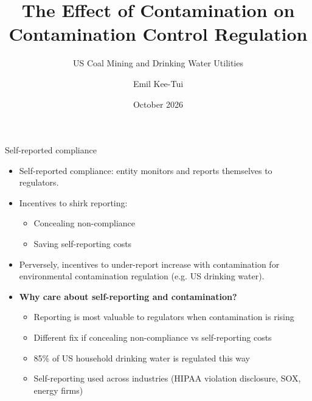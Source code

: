\documentclass{beamer}
\title[Contamination and Self-Reported Compliance]{The Effect of Contamination on Contamination Control Regulation}
\subtitle{US Coal Mining and Drinking Water Utilities}
\author{Emil Kee-Tui}
\institute{Charles H. Dyson School of Applied Economics and Management \\ Cornell University}
\date{October 2026}
\begin{document}
\begin{frame}
\titlepage
\end{frame}

\begin{frame}{Self-reported compliance}
\begin{itemize}
    \item Self-reported compliance: entity monitors and reports themselves to regulators.
    \item Incentives to shirk reporting:
    \begin{itemize}
        \item Concealing non-compliance
        \item Saving self-reporting costs
    \end{itemize}
    \item Perversely, incentives to under-report increase with contamination for environmental contamination regulation (e.g. US drinking water).
    \item \textbf{Why care about self-reporting and contamination?}
    \begin{itemize}
        \item Reporting is most valuable to regulators when contamination is rising
        \item Different fix if concealing non-compliance vs self-reporting costs
        \item 85\% of US household drinking water is regulated this way
        \item Self-reporting used across industries (HIPAA violation disclosure, SOX, energy firms)
    \end{itemize}
\end{itemize}
\end{frame}
\end{document}

